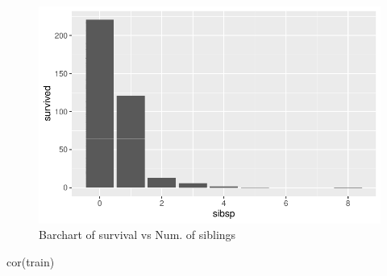 \documentclass[
  letterpaper,
  DIV=11,
  numbers=noendperiod]{scrartcl}
\newenvironment{Shaded}{\begin{snugshade}}{\end{snugshade}}
\newcommand{\FunctionTok}[1]{\textcolor[rgb]{0.28,0.35,0.67}{#1}}
\newcommand{\NormalTok}[1]{\textcolor[rgb]{0.00,0.23,0.31}{#1}}
\begin{document}
\begin{figure}[H]

{\centering \includegraphics{FinalProject_files/figure-pdf/unnamed-chunk-13-1.pdf}

}

\caption{Barchart of survival vs Num. of siblings}

\end{figure}%

\begin{Shaded}
\begin{Highlighting}[]
\FunctionTok{cor}\NormalTok{(train)}
\end{Highlighting}
\end{Shaded}
\end{document}
